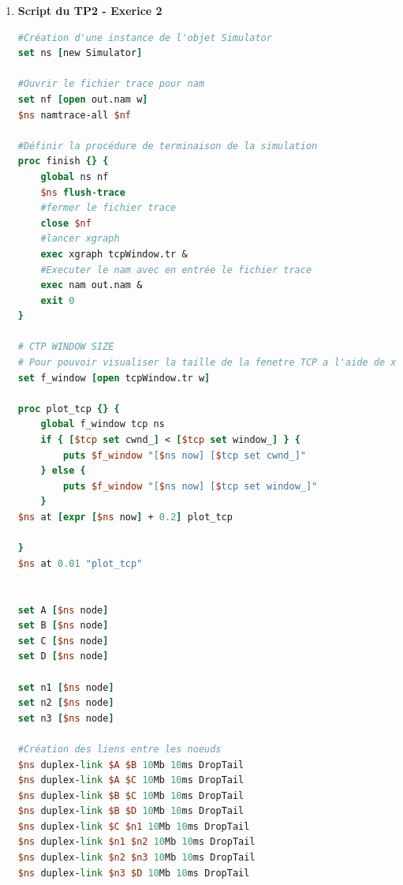 \documentclass[11pt]{article}
\begin{document}
\begin{enumerate}
\begin{lstlisting}[language=tcl, label={tp2Exo1}, caption={TP2 - Exercice1}]
# Connecter les applications aux agents
$cbr1 attach-agent $udp1
$cbr2 attach-agent $udp2

# Connecter les agents
$ns connect $udp1 $agentNull
$ns connect $udp2 $agentNull

#timers
$ns at 1.0 "$cbr1 start"
$ns at 2.0 "$cbr2 start"
$ns at 7.0 "$cbr1 stop"	
$ns at 6.0 "$cbr2 stop"
$ns rtmodel-at 4.0 down $n(5) $n(8)
$ns rtmodel-at 5.0 up $n(5) $n(8)	

#Terminer le script apres 8s
$ns at 8.0 "finish"

#exec la simulation
$ns run
\end{lstlisting}


~\\

\item \textbf{Script du TP2 - Exerice 2}
\begin{lstlisting}[language=tcl, label={tp2Exo2}, caption={TP2 - Exercice2}]
#Création d'une instance de l'objet Simulator
set ns [new Simulator]

#Ouvrir le fichier trace pour nam
set nf [open out.nam w]
$ns namtrace-all $nf

#Définir la procédure de terminaison de la simulation
proc finish {} {
	global ns nf
	$ns flush-trace
	#fermer le fichier trace
	close $nf
	#lancer xgraph
	exec xgraph tcpWindow.tr &
	#Executer le nam avec en entrée le fichier trace
	exec nam out.nam &
	exit 0
}

# CTP WINDOW SIZE
# Pour pouvoir visualiser la taille de la fenetre TCP a l'aide de xgraph
set f_window [open tcpWindow.tr w]

proc plot_tcp {} {
    global f_window tcp ns
    if { [$tcp set cwnd_] < [$tcp set window_] } {
        puts $f_window "[$ns now] [$tcp set cwnd_]"
    } else {
        puts $f_window "[$ns now] [$tcp set window_]"
    }
$ns at [expr [$ns now] + 0.2] plot_tcp

}
$ns at 0.01 "plot_tcp"


set A [$ns node]
set B [$ns node]
set C [$ns node]
set D [$ns node]

set n1 [$ns node]
set n2 [$ns node]
set n3 [$ns node]

#Création des liens entre les noeuds
$ns duplex-link $A $B 10Mb 10ms DropTail
$ns duplex-link $A $C 10Mb 10ms DropTail
$ns duplex-link $B $C 10Mb 10ms DropTail
$ns duplex-link $B $D 10Mb 10ms DropTail
$ns duplex-link $C $n1 10Mb 10ms DropTail
$ns duplex-link $n1 $n2 10Mb 10ms DropTail
$ns duplex-link $n2 $n3 10Mb 10ms DropTail
$ns duplex-link $n3 $D 10Mb 10ms DropTail


\end{lstlisting}
\end{enumerate}
\end{document}
